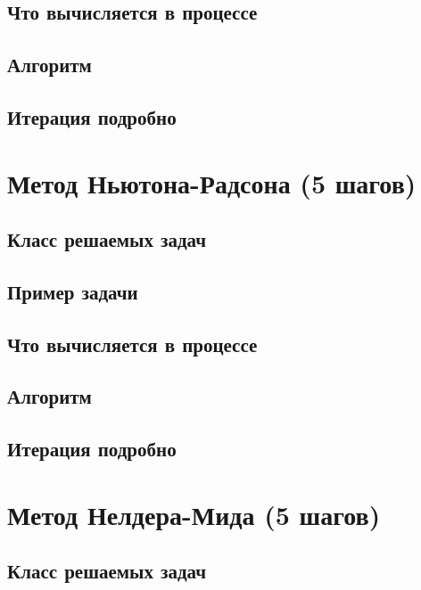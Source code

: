 \subsection{Что вычисляется в процессе}

\subsection{Алгоритм} %

\subsection{Итерация подробно} %

\section{Метод Ньютона-Радсона (5 шагов)}

\subsection{Класс решаемых задач} %

\subsection{Пример задачи} %

\subsection{Что вычисляется в процессе}

\subsection{Алгоритм} %

\subsection{Итерация подробно} %

\section{Метод Нелдера-Мида (5 шагов)}

\subsection{Класс решаемых задач} %

